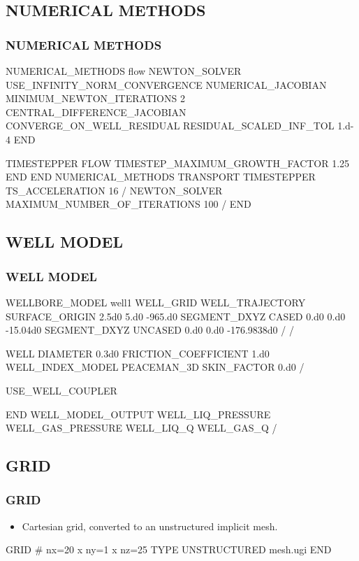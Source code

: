 \documentclass{beamer}
\begin{document}
\subsection{NUMERICAL METHODS}
\begin{frame}\frametitle{NUMERICAL METHODS}

\begin{semiverbatim}
NUMERICAL_METHODS flow
  NEWTON_SOLVER
    USE_INFINITY_NORM_CONVERGENCE
    NUMERICAL_JACOBIAN
    MINIMUM_NEWTON_ITERATIONS 2
    CENTRAL_DIFFERENCE_JACOBIAN
    CONVERGE_ON_WELL_RESIDUAL
    RESIDUAL_SCALED_INF_TOL 1.d-4
  END

  TIMESTEPPER FLOW
    TIMESTEP_MAXIMUM_GROWTH_FACTOR 1.25
  END
END
\newpage
NUMERICAL_METHODS TRANSPORT
  TIMESTEPPER
    TS_ACCELERATION 16
  /
  NEWTON_SOLVER
    MAXIMUM_NUMBER_OF_ITERATIONS 100
  /
END

\end{semiverbatim}
\end{frame}

\subsection{WELL MODEL}
\begin{frame}\frametitle{WELL MODEL}

\begin{semiverbatim}
WELLBORE_MODEL well1
  WELL_GRID
    WELL_TRAJECTORY
      SURFACE_ORIGIN 2.5d0 5.d0 -965.d0
      SEGMENT_DXYZ CASED 0.d0 0.d0 -15.04d0
      SEGMENT_DXYZ UNCASED 0.d0 0.d0 -176.9838d0
    /
  /

\newpage
  WELL
    DIAMETER 0.3d0
    FRICTION_COEFFICIENT 1.d0
    WELL_INDEX_MODEL PEACEMAN_3D
    SKIN_FACTOR 0.d0
  /

  USE_WELL_COUPLER

END
\newpage
WELL_MODEL_OUTPUT
  WELL_LIQ_PRESSURE
  WELL_GAS_PRESSURE
  WELL_LIQ_Q
  WELL_GAS_Q
/

\end{semiverbatim}
\end{frame}
\subsection{GRID}
\begin{frame}\frametitle{GRID}

\begin{itemize}
  \item Cartesian grid, converted to an unstructured implicit mesh.
\end{itemize}

\begin{semiverbatim}
GRID
  # nx=20 x ny=1 x nz=25
  TYPE UNSTRUCTURED mesh.ugi
END
\end{semiverbatim}

\end{frame}
\end{document}
